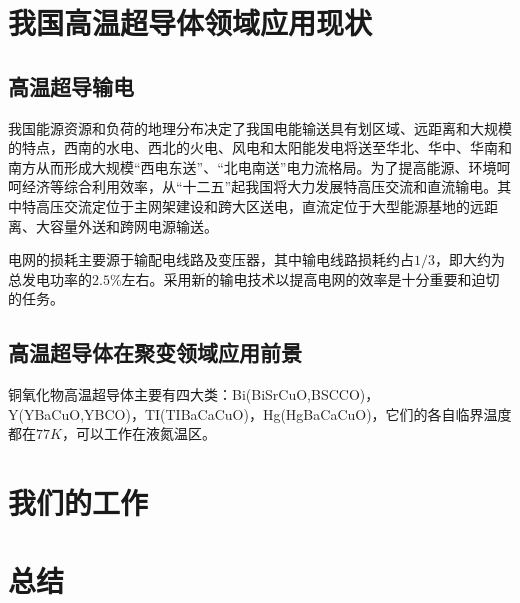 \documentclass[UTF8, twocolumn]{ctexart}
\begin{document}
\section{我国高温超导体领域应用现状}

    \subsection{高温超导输电}

    我国能源资源和负荷的地理分布决定了我国电能输送具有划区域、远距离和大规模的特点，西南的水电、西北的火电、风电和太阳能发电将送至华北、华中、华南和南方从而形成大规模“西电东送”、“北电南送”电力流格局\cite{严陆光2014关于发展高温超导输电的建议}。为了提高能源、环境呵呵经济等综合利用效率，从“十二五”起我国将大力发展特高压交流和直流输电。其中特高压交流定位于主网架建设和跨大区送电，直流定位于大型能源基地的远距离、大容量外送和跨网电源输送。

    电网的损耗主要源于输配电线路及变压器，其中输电线路损耗约占$1/3$，即大约为总发电功率的$2.5\%$左右。采用新的输电技术以提高电网的效率是十分重要和迫切的任务。

    \subsection{高温超导体在聚变领域应用前景}

    铜氧化物高温超导体主要有四大类：Bi(BiSrCuO,BSCCO)，Y(YBaCuO,YBCO)，TI(TIBaCaCuO)，Hg(HgBaCaCuO)，它们的各自临界温度都在$77K$，可以工作在液氮温区。\cite{孙林煜2012第二代高温超导体研究与在聚变领域应用前景}

\section{我们的工作}

\section{总结}

\kaishu
{}

\end{document}
